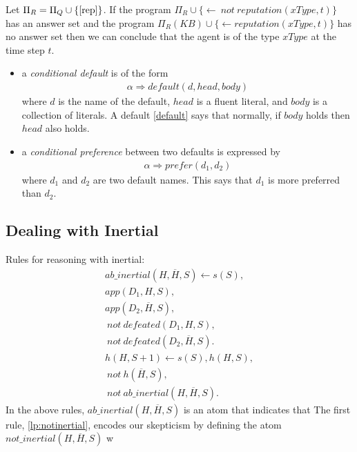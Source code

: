 \documentclass{article}
\newcommand{\memo}[1]{
  \ifthenelse {\boolean{includeMemo}}{\medskip\noindent\fbox{\begin{minipage}[b]{\dimexpr\linewidth-1em}#1\end{minipage}}\medskip\newline} 
}
\def\naf{\: {not} \:}
\begin{document}
Let $\Pi_R  = \Pi_Q  \cup \{\eqref{rep}\}$. If the program  
$\Pi_R   \cup \{\leftarrow \naf reputation(xType, t)\}$ has an answer set and the program 
$\Pi_R(KB)  \cup \{\leftarrow reputation(xType, t)\}$ has no answer set then we can conclude that the agent is of the type $xType$ 
at the time step $t$. 

\fi



\iffalse 
\begin{itemize} 
\item a \emph{conditional default} is of the form 
\begin{align}\label{c:default}
\alpha \Rightarrow default(d, head, body)
\end{align} 
where $d$ is the name of the default, $head$ is a fluent literal, and $body$ is a collection of literals.  A default \eqref{default} says that normally, if $body$ holds then $head$ also holds. 
\item a \emph{conditional preference} between two defaults is expressed by 
\begin{align}\label{c:prefs}
\alpha \Rightarrow prefer(d_1, d_2)
\end{align} 
where $d_1$ and $d_2$ are two default names. This says that $d_1$ is more preferred than $d_2$. 

\end{itemize} 

\subsection{Dealing with Inertial} 
 Rules for reasoning with inertial:
%
\begin{align}
ab\_inertial(H, \overline{H}, S) \leftarrow s(S), \label{lp:notinertial} \\
        app(D_1, H, S), \nonumber \\
        app(D_2, \overline{H}, S), \nonumber \\
        \naf defeated(D_1, H, S),  \nonumber \\
        \naf defeated(D_2, \overline{H}, S). \nonumber \\
h(H, S+1) \leftarrow s(S), h(H, S), \label{lp:inertial} \\ 
        \naf h(\overline{H}, S), \nonumber \\
        \naf ab\_inertial(H, \overline{H}, S). \nonumber        
\end{align} 
In the above rules, $ab\_inertial(H, \overline{H}, S)$ is an atom that indicates that 
The first rule, \eqref{lp:notinertial}, encodes our skepticism by defining the atom $not\_inertial(H, \overline{H}, S)$ w
\end{document}
